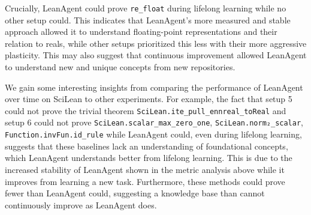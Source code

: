 \documentclass{article} %
\begin{document}
Crucially, LeanAgent could prove \texttt{re\_float} during lifelong learning while no other setup could. This indicates that LeanAgent's more measured and stable approach allowed it to understand floating-point representations and their relation to reals, while other setups prioritized this less with their more aggressive plasticity. This may also suggest that continuous improvement allowed LeanAgent to understand new and unique concepts from new repositories.



We gain some interesting insights from comparing the performance of LeanAgent over time on SciLean to other experiments. For example, the fact that setup 5 could not prove the trivial theorem \texttt{SciLean.ite\_pull\_ennreal\_toReal} and setup 6 could not prove \texttt{SciLean.scalar\_max\_zero\_one}, \texttt{SciLean.norm₂\_scalar}, \texttt{Function.invFun.id\_rule} while LeanAgent could, even during lifelong learning, suggests that these baselines lack an understanding of foundational concepts, which LeanAgent understands better from lifelong learning. This is due to the increased stability of LeanAgent shown in the metric analysis above while it improves from learning a new task. Furthermore, these methods could prove fewer than LeanAgent could, suggesting a knowledge base than cannot continuously improve as LeanAgent does.

\end{document}
